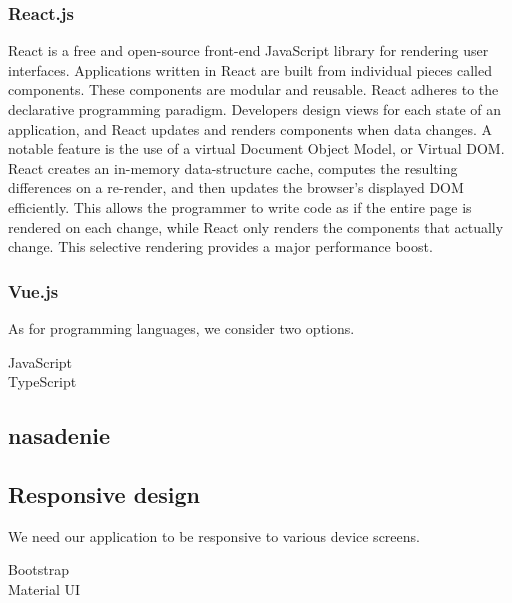 \subsubsection*{React.js}
React is a free and open-source front-end JavaScript library for rendering user interfaces.
Applications written in React are built from individual pieces called components.
These components are modular and reusable.
React adheres to the declarative programming paradigm. 
Developers design views for each state of an application, and React updates and renders components when data changes.
A notable feature is the use of a virtual Document Object Model, or Virtual DOM. 
React creates an in-memory data-structure cache, computes the resulting differences on a re-render, and then updates the browser's displayed DOM efficiently. 
This allows the programmer to write code as if the entire page is rendered on each change, while React only renders the components that actually change. 
This selective rendering provides a major performance boost.

\subsubsection*{Vue.js}

As for programming languages, we consider two options. 

\begin{description}
  \item[JavaScript] 
  \item[TypeScript] 
\end{description}


\subsection{nasadenie}

\subsection{Responsive design}
We need our application to be responsive to various device screens.
\begin{description}
  \item[Bootstrap] 
  \item[Material UI] 
\end{description}

